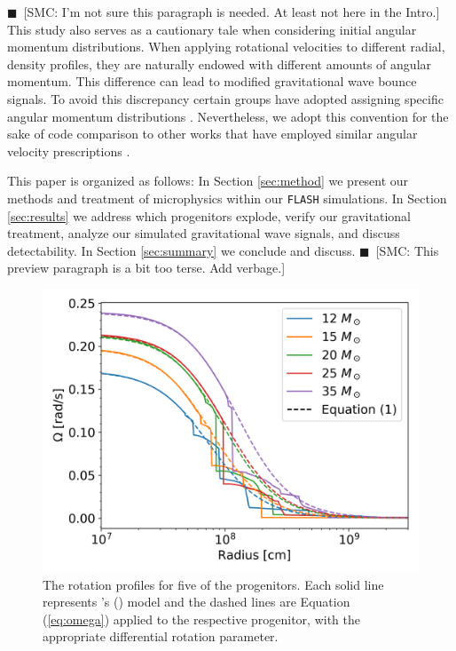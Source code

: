 \documentclass[twocolumn,times]{aastex62}  %
\newcommand{\smc}[1]{{\color{blue}$\blacksquare$~\textsf{[SMC: #1]}}}
\begin{document}
\smc{I'm not sure this paragraph is needed. At least not here in the Intro.} This study also serves as a cautionary tale when considering initial angular momentum distributions.  When applying rotational velocities to different radial, density profiles, they are naturally endowed with different amounts of angular momentum.  This difference can lead to modified gravitational wave bounce signals.    To avoid this discrepancy certain groups have adopted assigning specific angular momentum distributions \citep[eg.][]{oconnor:2011}.  Nevertheless, we adopt this convention for the sake of code comparison to other works that have employed similar angular velocity prescriptions \citep{richers:2017}.


This paper is organized as follows:  In Section \ref{sec:method} we present our methods and treatment of microphysics within our \texttt{FLASH} simulations.  In Section \ref{sec:results} we address which progenitors explode, verify our gravitational treatment, analyze our simulated gravitational wave signals, and discuss detectability.  In Section \ref{sec:summary} we conclude and discuss. \smc{This preview paragraph is a bit too terse. Add verbage.}


\begin{figure}[t]
    \centering
    \includegraphics[scale=0.45]{figures/omega_vs_r_m12.png}
    \caption{The rotation profiles for five of the \citet{heger:2005} progenitors.  Each solid line represents \citeauthor{heger:2005}'s (\citeyear{heger:2005}) model and the dashed lines are Equation (\ref{eq:omega}) applied to the respective progenitor, with the appropriate differential rotation parameter.  }
    \label{fig:ovsr}
\end{figure}
\end{document}
